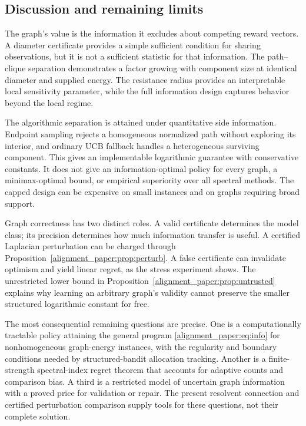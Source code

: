\subsection{Discussion and remaining limits}
The graph's value is the information it excludes about competing reward vectors. A diameter certificate provides a simple sufficient condition for sharing observations, but it is not a sufficient statistic for that information. The path--clique separation demonstrates a factor growing with component size at identical diameter and supplied energy. The resistance radius provides an interpretable local sensitivity parameter, while the full information design captures behavior beyond the local regime.

The algorithmic separation is attained under quantitative side information. Endpoint sampling rejects a homogeneous normalized path without exploring its interior, and ordinary UCB fallback handles a heterogeneous surviving component. This gives an implementable logarithmic guarantee with conservative constants. It does not give an information-optimal policy for every graph, a minimax-optimal bound, or empirical superiority over all spectral methods. The capped design can be expensive on small instances and on graphs requiring broad support.

Graph correctness has two distinct roles. A valid certificate determines the model class; its precision determines how much information transfer is useful. A certified Laplacian perturbation can be charged through Proposition~\ref{alignment_paper:prop:perturb}. A false certificate can invalidate optimism and yield linear regret, as the stress experiment shows. The unrestricted lower bound in Proposition~\ref{alignment_paper:prop:untrusted} explains why learning an arbitrary graph's validity cannot preserve the smaller structured logarithmic constant for free.

The most consequential remaining questions are precise. One is a computationally tractable policy attaining the general program \eqref{alignment_paper:eq:info} for nonhomogeneous graph-energy instances, with the regularity and boundary conditions needed by structured-bandit allocation tracking. Another is a finite-strength spectral-index regret theorem that accounts for adaptive counts and comparison bias. A third is a restricted model of uncertain graph information with a proved price for validation or repair. The present resolvent connection and certified perturbation comparison supply tools for these questions, not their complete solution.


